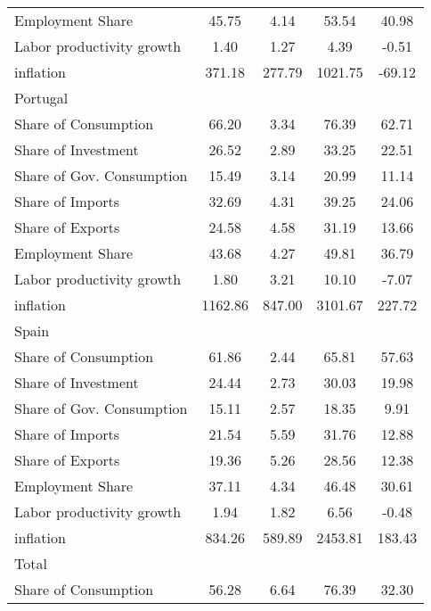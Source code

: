 {\begin{longtable}{l*{1}{cccc}}
Employment Share    &       45.75&        4.14&       53.54&       40.98\\
Labor productivity growth&        1.40&        1.27&        4.39&       -0.51\\
inflation           &      371.18&      277.79&     1021.75&      -69.12\\
Portugal            &            &            &            &            \\
Share of Consumption&       66.20&        3.34&       76.39&       62.71\\
Share of Investment &       26.52&        2.89&       33.25&       22.51\\
Share of Gov. Consumption&       15.49&        3.14&       20.99&       11.14\\
Share of Imports    &       32.69&        4.31&       39.25&       24.06\\
Share of Exports    &       24.58&        4.58&       31.19&       13.66\\
Employment Share    &       43.68&        4.27&       49.81&       36.79\\
Labor productivity growth&        1.80&        3.21&       10.10&       -7.07\\
inflation           &     1162.86&      847.00&     3101.67&      227.72\\
Spain               &            &            &            &            \\
Share of Consumption&       61.86&        2.44&       65.81&       57.63\\
Share of Investment &       24.44&        2.73&       30.03&       19.98\\
Share of Gov. Consumption&       15.11&        2.57&       18.35&        9.91\\
Share of Imports    &       21.54&        5.59&       31.76&       12.88\\
Share of Exports    &       19.36&        5.26&       28.56&       12.38\\
Employment Share    &       37.11&        4.34&       46.48&       30.61\\
Labor productivity growth&        1.94&        1.82&        6.56&       -0.48\\
inflation           &      834.26&      589.89&     2453.81&      183.43\\
Total               &            &            &            &            \\
Share of Consumption&       56.28&        6.64&       76.39&       32.30\\

\end{longtable}}
